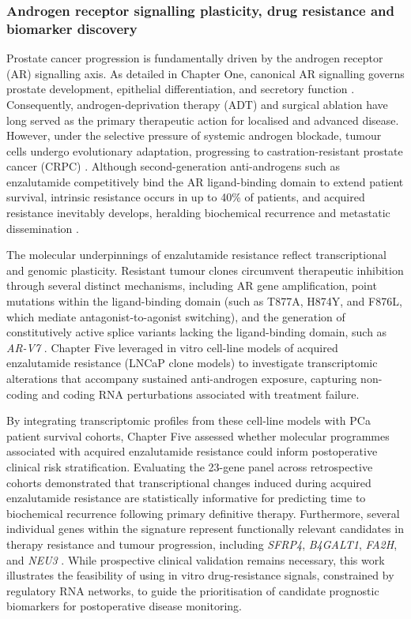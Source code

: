 \subsubsection{Androgen receptor signalling plasticity, drug resistance and biomarker discovery}
Prostate cancer progression is fundamentally driven by the androgen receptor (AR) signalling axis. As detailed in Chapter One, canonical AR signalling governs prostate development, epithelial differentiation, and secretory function \cite{Rebello2021Feb}. Consequently, androgen-deprivation therapy (ADT) and surgical ablation have long served as the primary therapeutic action for localised and advanced disease. However, under the selective pressure of systemic androgen blockade, tumour cells undergo evolutionary adaptation, progressing to castration-resistant prostate cancer (CRPC) \cite{Scher2012Sep, Cornford2017}. Although second-generation anti-androgens such as enzalutamide competitively bind the AR ligand-binding domain to extend patient survival, intrinsic resistance occurs in up to 40\% of patients, and acquired resistance inevitably develops, heralding biochemical recurrence and metastatic dissemination \cite{Rans2022, Shore2024}.

The molecular underpinnings of enzalutamide resistance reflect transcriptional and genomic plasticity. Resistant tumour clones circumvent therapeutic inhibition through several distinct mechanisms, including AR gene amplification, point mutations within the ligand-binding domain (such as T877A, H874Y, and F876L, which mediate antagonist-to-agonist switching), and the generation of constitutively active splice variants lacking the ligand-binding domain, such as \textit{AR-V7} \cite{Azad2015May, Hu2009Jan, Csizmarik2021Oct}. Chapter Five leveraged in vitro cell-line models of acquired enzalutamide resistance (LNCaP clone models) to investigate transcriptomic alterations that accompany sustained anti-androgen exposure, capturing non-coding and coding RNA perturbations associated with treatment failure.

By integrating transcriptomic profiles from these cell-line models with PCa patient survival cohorts, Chapter Five assessed whether molecular programmes associated with acquired enzalutamide resistance could inform postoperative clinical risk stratification. Evaluating the 23-gene panel across retrospective cohorts demonstrated that transcriptional changes induced during acquired enzalutamide resistance are statistically informative for predicting time to biochemical recurrence following primary definitive therapy. Furthermore, several individual genes within the signature represent functionally relevant candidates in therapy resistance and tumour progression, including \textit{SFRP4}, \textit{B4GALT1}, \textit{FA2H}, and \textit{NEU3} \cite{Sandsmark2017Oct, DeVitis2019Nov, Yao2019Mar, Kawamura2012Jan}. While prospective clinical validation remains necessary, this work illustrates the feasibility of using in vitro drug-resistance signals, constrained by regulatory RNA networks, to guide the prioritisation of candidate prognostic biomarkers for postoperative disease monitoring.

